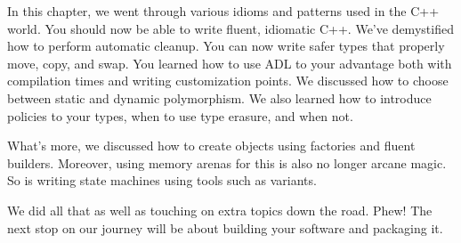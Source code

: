 In this chapter, we went through various idioms and patterns used in the C++ world. You should now be able to write fluent, idiomatic C++. We've demystified how to perform automatic cleanup. You can now write safer types that properly move, copy, and swap. You learned how to use ADL to your advantage both with compilation times and writing customization points. We discussed how to choose between static and dynamic polymorphism. We also learned how to introduce policies to your types, when to use type erasure, and when not.

What's more, we discussed how to create objects using factories and fluent builders. Moreover, using memory arenas for this is also no longer arcane magic. So is writing state machines using tools such as variants.

We did all that as well as touching on extra topics down the road. Phew! The next stop on our journey will be about building your software and packaging it.